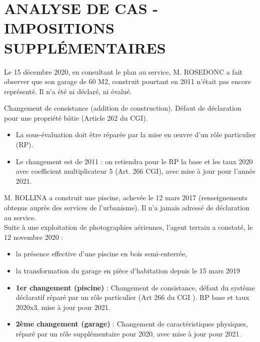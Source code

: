 \documentclass[answers, 12pt]{exam}
\begin{document}
	
	\section*{ANALYSE DE CAS  - IMPOSITIONS SUPPLÉMENTAIRES}
	
	\begin{questions}
		\question Le 15 décembre 2020, en consultant le plan au service, M. ROSEDONC a fait observer que son garage de 60 M2, construit pourtant en 2011 n'était pas encore représenté. Il n'a été ni déclaré, ni évalué.
		\begin{solution}
			Changement de consistance (addition de construction). Défaut de déclaration pour une propriété bâtie (Article 262 du CGI).
			\begin{itemize}
				\item La sous-évaluation doit être réparée par la mise en œuvre d'un rôle particulier (RP).
				\item Le changement est de 2011 : on retiendra pour le RP la base et les taux 2020 avec coefficient multiplicateur 5 (Art. 266 CGI), avec mise à jour pour l'année 2021.
			\end{itemize}
		\end{solution}
		
		\question M. ROLLINA a construit une piscine, achevée le 12 mars 2017 (renseignements obtenus auprès des services de l'urbanisme). Il n'a jamais adressé de déclaration au service.\\
		
		Suite à une exploitation de photographies aériennes, l'agent terrain a constaté, le 12 novembre 2020 :
		\begin{itemize}
			\item la présence effective d'une piscine en bois semi-enterrée,
		\item  la transformation du garage en pièce d'habitation depuis le 15 mars 2019
          \end{itemize}
		\begin{solution}
			\begin{itemize}
				\item \textbf{1er changement (piscine)} : Changement de consistance, défaut du système déclaratif réparé par un rôle particulier (Art 266 du CGI ). RP base et taux 2020x3, mise à jour pour 2021.
				\item \textbf{2ème changement (garage)} : Changement de caractéristiques physiques, réparé par un rôle supplémentaire pour 2020, avec mise à jour pour 2021.
			\end{itemize}
		\end{solution}
		
	\end{questions}
	
\end{document}
